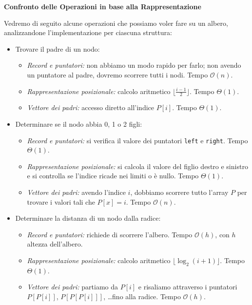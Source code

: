 \documentclass[12pt]{report}
\begin{document}
    \textbf{Confronto delle Operazioni in base alla Rappresentazione}
    
    Vedremo di seguito alcune operazioni che possiamo voler fare su un albero, analizzandone l'implementazione per ciascuna struttura:
    
    \begin{itemize}
    	\item Trovare il padre di un nodo:
    	\begin{itemize}
    		\item \textit{Record e puntatori:} non abbiamo un modo rapido per farlo; non avendo un puntatore al padre, dovremo scorrere tutti i nodi. Tempo $\mathcal{O}(n)$.
    		\item \textit{Rappresentazione posizionale:} calcolo aritmetico $\lfloor \frac{i-1}{2} \rfloor$. Tempo $\Theta(1)$.
    		\item \textit{Vettore dei padri:} accesso diretto all'indice $P[i]$. Tempo $\Theta(1)$.
    	\end{itemize}
    	
    	\item Determinare se il nodo abbia 0, 1 o 2 figli:
    	\begin{itemize}
    		\item \textit{Record e puntatori:} si verifica il valore dei puntatori \texttt{left} e \texttt{right}. Tempo $\Theta(1)$.
    		\item \textit{Rappresentazione posizionale:} si calcola il valore del figlio destro e sinistro e si controlla se l'indice ricade nei limiti o è nullo. Tempo $\Theta(1)$.
    		\item \textit{Vettore dei padri:} avendo l'indice $i$, dobbiamo scorrere tutto l'array $P$ per trovare i valori tali che $P[x] = i$. Tempo $\mathcal{O}(n)$.
    	\end{itemize}
    	
    	\item Determinare la distanza di un nodo dalla radice:
    	\begin{itemize}
    		\item \textit{Record e puntatori:} richiede di scorrere l'albero. Tempo $\mathcal{O}(h)$, con $h$ altezza dell'albero.
    		\item \textit{Rappresentazione posizionale:} calcolo aritmetico $\lfloor \log_2(i+1) \rfloor$. Tempo $\Theta(1)$.
    		\item \textit{Vettore dei padri:} partiamo da $P[i]$ e risaliamo attraverso i puntatori $P[P[i]]$, $P[P[P[i]]]$, \dots fino alla radice. Tempo $\mathcal{O}(h)$.
    	\end{itemize}
    	
    \end{itemize}
\end{document}
